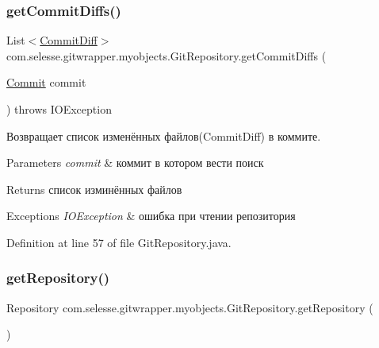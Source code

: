 \subsubsection{\texorpdfstring{get\+Commit\+Diffs()}{getCommitDiffs()}}
{\footnotesize\ttfamily List$<$\hyperlink{classcom_1_1selesse_1_1gitwrapper_1_1myobjects_1_1_commit_diff}{Commit\+Diff}$>$ com.\+selesse.\+gitwrapper.\+myobjects.\+Git\+Repository.\+get\+Commit\+Diffs (\begin{DoxyParamCaption}\item[{\hyperlink{classcom_1_1selesse_1_1gitwrapper_1_1myobjects_1_1_commit}{Commit}}]{commit }\end{DoxyParamCaption}) throws I\+O\+Exception}

Возвращает список изменённых файлов(\+Commit\+Diff) в коммите.


\begin{DoxyParams}{Parameters}
{\em commit} & коммит в котором вести поиск \\
\hline
\end{DoxyParams}
\begin{DoxyReturn}{Returns}
список изминённых файлов 
\end{DoxyReturn}

\begin{DoxyExceptions}{Exceptions}
{\em I\+O\+Exception} & ошибка при чтении репозитория \\
\hline
\end{DoxyExceptions}


Definition at line 57 of file Git\+Repository.\+java.

\mbox{\label{classcom_1_1selesse_1_1gitwrapper_1_1myobjects_1_1_git_repository_abe9983bad89ba97034e675390e58a5cd}} 
\subsubsection{\texorpdfstring{get\+Repository()}{getRepository()}}
{\footnotesize\ttfamily Repository com.\+selesse.\+gitwrapper.\+myobjects.\+Git\+Repository.\+get\+Repository (\begin{DoxyParamCaption}{ }\end{DoxyParamCaption})}

